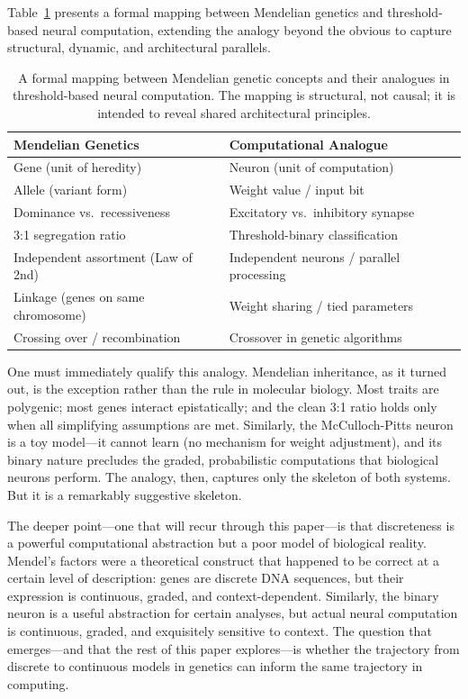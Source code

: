 \documentclass[12pt,a4paper]{article}
\begin{document}
Table~\ref{tab:mendelian} presents a formal mapping between Mendelian genetics and threshold-based neural computation, extending the analogy beyond the obvious to capture structural, dynamic, and architectural parallels.

\begin{table}[htbp]
\centering
\caption{A formal mapping between Mendelian genetic concepts and their analogues in threshold-based neural computation. The mapping is structural, not causal; it is intended to reveal shared architectural principles.}
\label{tab:mendelian}
\begin{tabular}{ll}
\toprule
\textbf{Mendelian Genetics} & \textbf{Computational Analogue} \\
\midrule
Gene (unit of heredity) & Neuron (unit of computation) \\
Allele (variant form) & Weight value / input bit \\
Dominance vs.\ recessiveness & Excitatory vs.\ inhibitory synapse \\
3:1 segregation ratio & Threshold-binary classification \\
Independent assortment (Law of 2nd) & Independent neurons / parallel processing \\
Linkage (genes on same chromosome) & Weight sharing / tied parameters \\
Crossing over / recombination & Crossover in genetic algorithms \\
\bottomrule
\end{tabular}
\end{table}

One must immediately qualify this analogy. Mendelian inheritance, as it turned out, is the exception rather than the rule in molecular biology. Most traits are polygenic; most genes interact epistatically; and the clean 3:1 ratio holds only when all simplifying assumptions are met. Similarly, the McCulloch-Pitts neuron is a toy model---it cannot learn (no mechanism for weight adjustment), and its binary nature precludes the graded, probabilistic computations that biological neurons perform. The analogy, then, captures only the skeleton of both systems. But it is a remarkably suggestive skeleton.

The deeper point---one that will recur through this paper---is that discreteness is a powerful computational abstraction but a poor model of biological reality. Mendel's factors were a theoretical construct that happened to be correct at a certain level of description: genes are discrete DNA sequences, but their expression is continuous, graded, and context-dependent. Similarly, the binary neuron is a useful abstraction for certain analyses, but actual neural computation is continuous, graded, and exquisitely sensitive to context. The question that emerges---and that the rest of this paper explores---is whether the trajectory from discrete to continuous models in genetics can inform the same trajectory in computing.
\end{document}
